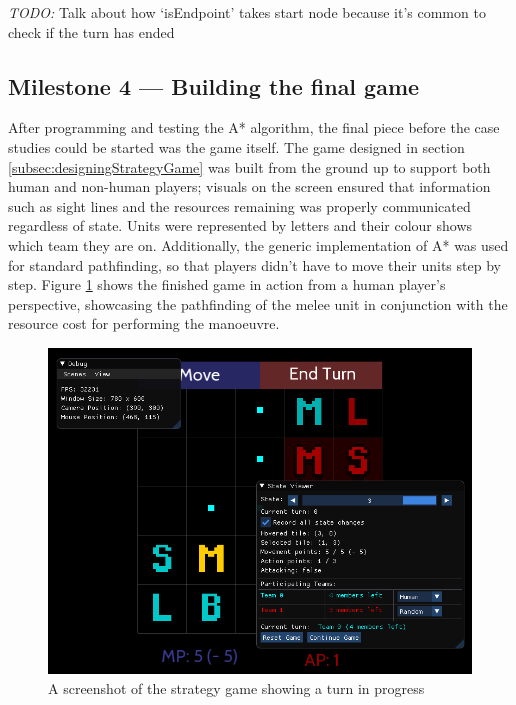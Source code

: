 \documentclass[11pt, a4paper]{report}
\begin{document}
\emph{TODO:} Talk about how `isEndpoint' takes start node because it's common to check if the turn has ended

\subsection[Building the final game]{Milestone 4 --- Building the final game}
\label{subsec:buildingTheFinalGame}

After programming and testing the A* algorithm, the final piece before the case studies could be started was the game itself. The game designed in section \ref{subsec:designingStrategyGame} was built from the ground up to support both human and non-human players; visuals on the screen ensured that information such as sight lines and the resources remaining was properly communicated regardless of state. Units were represented by letters and their colour shows which team they are on. Additionally, the generic implementation of A* was used for standard pathfinding, so that players didn't have to move their units step by step. Figure \ref{fig:strategyGame} shows the finished game in action from a human player's perspective, showcasing the pathfinding of the melee unit in conjunction with the resource cost for performing the manoeuvre.

\begin{figure}[!h]
  \centering
  \includegraphics[width=\linewidth]{img/strategy_game.png}
  \caption{A screenshot of the strategy game showing a turn in progress}
  \label{fig:strategyGame}
\end{figure}
\end{document}
